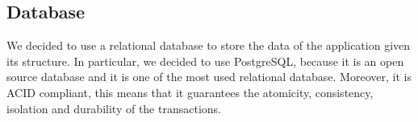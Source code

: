 \subsection{Database}
\label{ss:other-design-decisions-database}%
We decided to use a relational database to store the data of the application given its structure. In particular, we decided to use PostgreSQL, because it is an open source database and it is one of the most used relational database. Moreover, it is ACID compliant, this means that it guarantees the atomicity, consistency, isolation and durability of the transactions.
